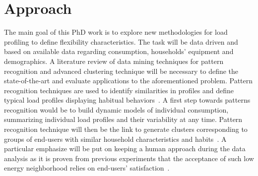 \documentclass[fleqn,a4paper,twoside,10pt]{article}
\begin{document}

\section{Approach}
	
 	The main goal of this PhD work is to explore new methodologies for load profiling to define flexibility characteristics. The task will be data driven and based on available data regarding consumption, households' equipment and demographics. A literature review of data mining techniques for pattern recognition and advanced clustering technique will be necessary to define the state-of-the-art and evaluate applications to the aforementioned problem. Pattern recognition techniques are used to identify similarities in profiles and define typical load profiles displaying habitual behaviors~\cite{Abreu2012}. A first step towards patterns recognition would be to build dynamic models of individual consumption, summarizing individual load profiles and their variability at any time. Pattern recognition technique will then be the link to generate clusters corresponding to groups of end-users with similar household characteristics and habits~\cite{albert2013}. A particular emphasize will be put on keeping a human approach during the data analysis as it is proven from previous experiments that the acceptance of such low energy neighborhood relies on end-users' satisfaction~\cite{Mlecnik2012}.
 	
\end{document}
